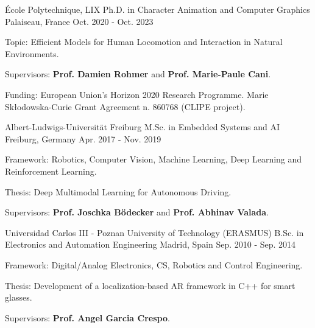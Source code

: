 

\begin{cventries}

  \cventry
    {École Polytechnique, LIX} %
    {Ph.D. in Character Animation and Computer Graphics} %
    {Palaiseau, France} %
    {Oct. 2020 - Oct. 2023} %
    {
      \begin{cvitems} %
        \item {Topic: Efficient Models for Human Locomotion and Interaction in Natural Environments.}
        \item {Supervisors: \textbf{Prof. Damien Rohmer} and \textbf{Prof. Marie-Paule Cani}.}
        \item {Funding: European Union’s Horizon 2020 Research Programme. Marie Skłodowska-Curie Grant Agreement n. 860768 (CLIPE project).}
      \end{cvitems}
    }

  \cventry
    {Albert-Ludwigs-Universität Freiburg} %
    {M.Sc. in Embedded Systems and AI} %
    {Freiburg, Germany} %
    {Apr. 2017 - Nov. 2019} %
    {
      \begin{cvitems} %
        \item {Framework: Robotics, Computer Vision, Machine Learning, Deep Learning and Reinforcement Learning.}
        \item {Thesis: Deep Multimodal Learning for Autonomous Driving.}
        \item {Supervisors: \textbf{Prof. Joschka Bödecker} and \textbf{Prof. Abhinav Valada}.}
      \end{cvitems}
    }

  \cventry
    {Universidad Carlos III - Poznan University of Technology (ERASMUS)} %
    {B.Sc. in Electronics and Automation Engineering} %
    {Madrid, Spain} %
    {Sep. 2010 - Sep. 2014} %
    {
      \begin{cvitems} %
        \item {Framework: Digital/Analog Electronics, CS, Robotics and Control Engineering.}
        \item {Thesis: Development of a localization-based AR framework in C++ for smart glasses.}
        \item {Supervisors: \textbf{Prof. Angel Garcia Crespo}.}
      \end{cvitems}
    }

\end{cventries}
